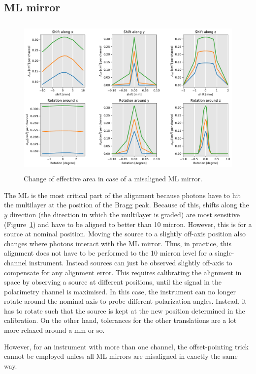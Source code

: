 \documentclass[]{spie}  %
\begin{document}
\subsection{ML mirror}
\begin{figure} [ht]
  \begin{center}
    \includegraphics[height=8cm]{LGML_global.pdf}
  \end{center}
  \caption
      { \label{fig:LGML_global}Change of effective area in case of a misaligned ML mirror. 
}
\end{figure}

The ML is the most critical part of the alignment because photons have to hit the multilayer at the position of the Bragg peak. Because of this, shifts along the $y$ direction (the direction in which the multilayer is graded) are most sensitive (Figure~\ref{fig:LGML_global}) and have to be aligned to better than 10 micron. However, this is for a source at nominal position. Moving the source to a slightly off-axis position also changes where photons interact with the ML mirror. Thus, in practice, this alignment does not have to be performed to the 10 micron level for a single-channel instrument. Instead sources can just be observed slightly off-axis to compensate for any alignment error. This requires calibrating the alignment in space by observing a source at different positions, until the signal in the polarimetry channel is maximised. In this case, the instrument can no longer rotate around the nominal axis to probe different polarization angles. Instead, it has to rotate such that the source is kept at the new position determined in the calibration. On the other hand, tolerances for the other translations are a lot more relaxed around a mm or so.

However, for an instrument with more than one channel, the offset-pointing trick cannot be employed unless all ML mirrors are misaligned in exactly the same way.
\end{document}
